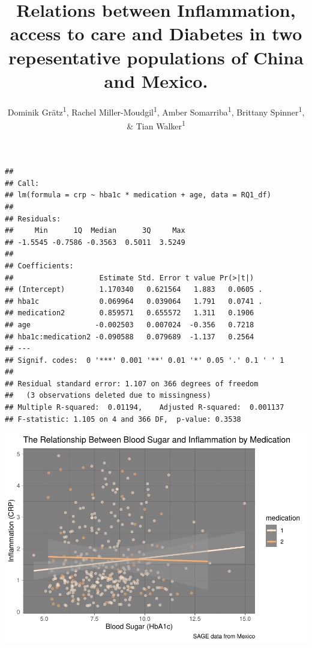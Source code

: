 \documentclass[
  man,floatsintext]{apa6}
\title{Relations between Inflammation, access to care and Diabetes in two repesentative populations of China and Mexico.}
\author{Dominik Grätz\textsuperscript{1}, Rachel Miller-Moudgil\textsuperscript{1}, Amber Somarriba\textsuperscript{1}, Brittany Spinner\textsuperscript{1}, \& Tian Walker\textsuperscript{1}}
\date{}
\affiliation{\vspace{0.5cm}\textsuperscript{1} University of Oregon}
\begin{document}
\maketitle

\begin{verbatim}
## 
## Call:
## lm(formula = crp ~ hba1c * medication + age, data = RQ1_df)
## 
## Residuals:
##     Min      1Q  Median      3Q     Max 
## -1.5545 -0.7586 -0.3563  0.5011  3.5249 
## 
## Coefficients:
##                    Estimate Std. Error t value Pr(>|t|)  
## (Intercept)        1.170340   0.621564   1.883   0.0605 .
## hba1c              0.069964   0.039064   1.791   0.0741 .
## medication2        0.859571   0.655572   1.311   0.1906  
## age               -0.002503   0.007024  -0.356   0.7218  
## hba1c:medication2 -0.090588   0.079689  -1.137   0.2564  
## ---
## Signif. codes:  0 '***' 0.001 '**' 0.01 '*' 0.05 '.' 0.1 ' ' 1
## 
## Residual standard error: 1.107 on 366 degrees of freedom
##   (3 observations deleted due to missingness)
## Multiple R-squared:  0.01194,    Adjusted R-squared:  0.001137 
## F-statistic: 1.105 on 4 and 366 DF,  p-value: 0.3538
\end{verbatim}

\includegraphics{NEW_Final_Groupof5_files/figure-latex/unnamed-chunk-1-1.pdf}
\end{document}
